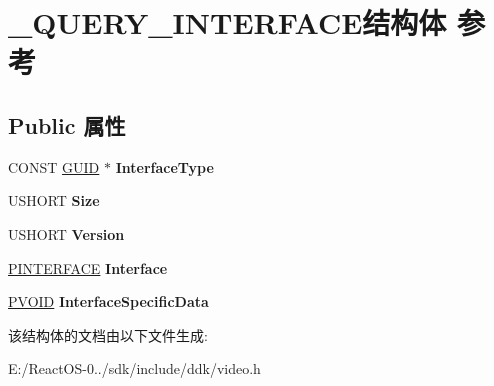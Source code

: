 \hypertarget{struct___q_u_e_r_y___i_n_t_e_r_f_a_c_e}{}\section{\+\_\+\+Q\+U\+E\+R\+Y\+\_\+\+I\+N\+T\+E\+R\+F\+A\+C\+E结构体 参考}
\label{struct___q_u_e_r_y___i_n_t_e_r_f_a_c_e}
\subsection*{Public 属性}
\begin{DoxyCompactItemize}
\item 
\mbox{\label{struct___q_u_e_r_y___i_n_t_e_r_f_a_c_e_a8c2ee451d0f892bcb77bdbb6e1bf4c5e}} 
C\+O\+N\+ST \hyperlink{interface_g_u_i_d}{G\+U\+ID} $\ast$ {\bfseries Interface\+Type}
\item 
\mbox{\label{struct___q_u_e_r_y___i_n_t_e_r_f_a_c_e_a9bad2f3ad45a896c4c31b33f18aff031}} 
U\+S\+H\+O\+RT {\bfseries Size}
\item 
\mbox{\label{struct___q_u_e_r_y___i_n_t_e_r_f_a_c_e_acadf19dde68e935710f0922479219d56}} 
U\+S\+H\+O\+RT {\bfseries Version}
\item 
\mbox{\label{struct___q_u_e_r_y___i_n_t_e_r_f_a_c_e_ab4a22b6546a199b3e73b84ff1b04d04c}} 
\hyperlink{struct___i_n_t_e_r_f_a_c_e}{P\+I\+N\+T\+E\+R\+F\+A\+CE} {\bfseries Interface}
\item 
\mbox{\label{struct___q_u_e_r_y___i_n_t_e_r_f_a_c_e_af0a7e2245339e7bdba126a01e3038a4e}} 
\hyperlink{interfacevoid}{P\+V\+O\+ID} {\bfseries Interface\+Specific\+Data}
\end{DoxyCompactItemize}


该结构体的文档由以下文件生成\+:\begin{DoxyCompactItemize}
\item 
E\+:/\+React\+O\+S-\/0../sdk/include/ddk/video.\+h\end{DoxyCompactItemize}
